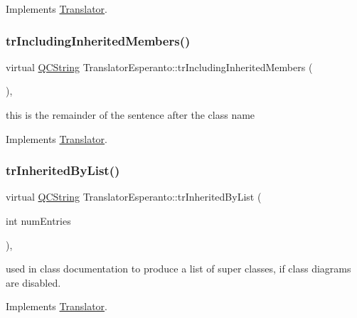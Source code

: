 Implements \mbox{\hyperlink{class_translator}{Translator}}.

\mbox{\label{class_translator_esperanto_a3d07fe2e4b9828bd5dc7f79b4f991edd}} 
\subsubsection{\texorpdfstring{trIncludingInheritedMembers()}{trIncludingInheritedMembers()}}
{\footnotesize\ttfamily virtual \mbox{\hyperlink{class_q_c_string}{Q\+C\+String}} Translator\+Esperanto\+::tr\+Including\+Inherited\+Members (\begin{DoxyParamCaption}{ }\end{DoxyParamCaption})\hspace{0.3cm}{\ttfamily [inline]}, {\ttfamily [virtual]}}

this is the remainder of the sentence after the class name 

Implements \mbox{\hyperlink{class_translator}{Translator}}.

\mbox{\label{class_translator_esperanto_a7727b762854d482dfe963773d9908001}} 
\subsubsection{\texorpdfstring{trInheritedByList()}{trInheritedByList()}}
{\footnotesize\ttfamily virtual \mbox{\hyperlink{class_q_c_string}{Q\+C\+String}} Translator\+Esperanto\+::tr\+Inherited\+By\+List (\begin{DoxyParamCaption}\item[{int}]{num\+Entries }\end{DoxyParamCaption})\hspace{0.3cm}{\ttfamily [inline]}, {\ttfamily [virtual]}}

used in class documentation to produce a list of super classes, if class diagrams are disabled. 

Implements \mbox{\hyperlink{class_translator}{Translator}}.

